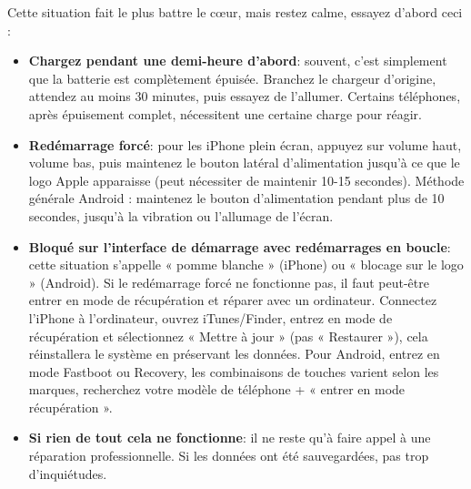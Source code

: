 
Cette situation fait le plus battre le cœur, mais restez calme, essayez d'abord ceci :

\begin{itemize}
  \item \textbf{Chargez pendant une demi-heure d'abord}: souvent, c'est simplement que la batterie est complètement épuisée. Branchez le chargeur d'origine, attendez au moins 30 minutes, puis essayez de l'allumer. Certains téléphones, après épuisement complet, nécessitent une certaine charge pour réagir.
  \item \textbf{Redémarrage forcé}: pour les iPhone plein écran, appuyez sur volume haut, volume bas, puis maintenez le bouton latéral d'alimentation jusqu'à ce que le logo Apple apparaisse (peut nécessiter de maintenir 10-15 secondes). Méthode générale Android : maintenez le bouton d'alimentation pendant plus de 10 secondes, jusqu'à la vibration ou l'allumage de l'écran.
  \item \textbf{Bloqué sur l'interface de démarrage avec redémarrages en boucle}: cette situation s'appelle « pomme blanche » (iPhone) ou « blocage sur le logo » (Android). Si le redémarrage forcé ne fonctionne pas, il faut peut-être entrer en mode de récupération et réparer avec un ordinateur. Connectez l'iPhone à l'ordinateur, ouvrez iTunes/Finder, entrez en mode de récupération et sélectionnez « Mettre à jour » (pas « Restaurer »), cela réinstallera le système en préservant les données. Pour Android, entrez en mode Fastboot ou Recovery, les combinaisons de touches varient selon les marques, recherchez votre modèle de téléphone + « entrer en mode récupération ».
  \item \textbf{Si rien de tout cela ne fonctionne}: il ne reste qu'à faire appel à une réparation professionnelle. Si les données ont été sauvegardées, pas trop d'inquiétudes.
\end{itemize}


